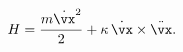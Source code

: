 \begin{equation}
     H=\frac{m\dot{\vx}\strut^2}{2}+\kappa\,\dot{\vx}\times\ddot{\vx}.
     \label{energy}
\end{equation}

